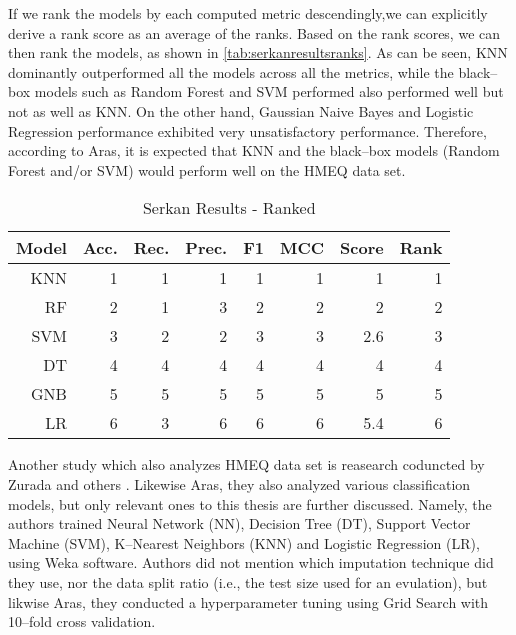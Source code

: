 If we rank the models by each computed metric descendingly,we can explicitly derive a rank score as an average of the ranks. Based on the rank scores, we can then rank the models, as shown in \autoref{tab:serkanresultsranks}. As can be seen, KNN dominantly outperformed all the models across all the metrics, while the black--box models such as Random Forest and SVM performed also performed well but not as well as KNN.
On the other hand, Gaussian Naive Bayes and Logistic Regression performance exhibited very unsatisfactory performance.
Therefore, according to Aras, it is expected that KNN and the black--box models (Random Forest and/or SVM) would perform well on the HMEQ data set.

\begin{table}[H]
    \small
    \setlength{\tabcolsep}{8pt}
    \renewcommand{\arraystretch}{1.3}
    \centering
    \caption[Serkan Results - Ranked]{Serkan Results - Ranked}\label{tab:serkanresultsranks}
    \begin{tabular}{r r r r r r r r}
    \toprule
    Model & Acc. & Rec. & Prec. & F1 & MCC & Score & Rank \\
    \midrule
    \hline
	
    KNN & 1 & 1 & 1 & 1 & 1 & 1 & 1 \\ 
    RF & 2 & 1 & 3 & 2 & 2 & 2 & 2 \\ 
    SVM & 3 & 2 & 2 & 3 & 3 & 2.6 & 3 \\ 
    DT & 4 & 4 & 4 & 4 & 4 & 4 & 4 \\ 
    GNB & 5 & 5 & 5 & 5 & 5 & 5 & 5 \\ 
    LR & 6 & 3 & 6 & 6 & 6 & 5.4 & 6 \\ 
	
    \hline
    \bottomrule
    \end{tabular}
    \vspace{0.35em}
    
    \vspace{-1em}
\end{table}


Another study which also analyzes HMEQ data set is reasearch coduncted by Zurada and others \citep{zurada2014classification}. Likewise Aras, they also analyzed various classification models, but only relevant ones to this thesis are further discussed.
Namely, the authors trained Neural Network (NN), Decision Tree (DT), Support Vector Machine (SVM), K--Nearest Neighbors (KNN) and Logistic Regression (LR), using Weka software.
Authors did not mention which imputation technique did they use, nor the data split ratio (i.e., the test size used for an evulation), but likwise Aras, they conducted a hyperparameter tuning using Grid Search with 10--fold cross validation.


